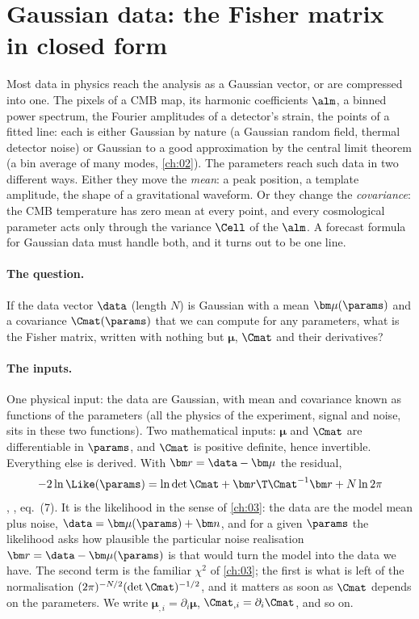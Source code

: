 \section{Gaussian data: the Fisher matrix in closed form}
\label{10a:sec:gauss}

Most data in physics reach the analysis as a Gaussian vector, or are compressed into one. The pixels of a CMB
map, its harmonic coefficients $\alm$, a binned power spectrum, the Fourier amplitudes of a detector's
strain, the points of a fitted line: each is either Gaussian by nature (a Gaussian random field, thermal
detector noise) or Gaussian to a good approximation by the central limit theorem (a bin average of many
modes, \cref{ch:02}). The parameters reach such data in two different ways. Either they move the
\emph{mean}: a peak position, a template amplitude, the shape of a gravitational waveform. Or they change the
\emph{covariance}: the CMB temperature has zero mean at every point, and every cosmological parameter acts
only through the variance $\Cell$ of the $\alm$. A forecast formula for Gaussian data must handle both, and
it turns out to be one line.

\paragraph{The question.} If the data vector $\data$ (length $N$) is Gaussian with a mean $\bm\mu(\params)$ and a
covariance $\Cmat(\params)$ that we can compute for any parameters, what is the Fisher matrix, written with
nothing but $\bm\mu$, $\Cmat$ and their derivatives?

\paragraph{The inputs.} One physical input: the data are Gaussian, with mean and covariance known as functions of
the parameters (all the physics of the experiment, signal and noise, sits in these two functions). Two
mathematical inputs: $\bm\mu$ and $\Cmat$ are differentiable in $\params$, and $\Cmat$ is positive definite,
hence invertible. Everything else is derived. With $\bm r=\data-\bm\mu$ the residual,
\begin{equation}
  -2\ln\Like(\params)=\ln\det\Cmat+\bm r\T\Cmat^{-1}\bm r+N\ln2\pi
  \label{10a:eq:gauss-like}
\end{equation}
, \cite{TTH1997}, eq.~(7). It is the likelihood in the sense of \cref{ch:03}: the data are the model mean plus noise, $\data=\bm\mu(\params)+\bm n$, and for a given $\params$ the likelihood asks how plausible the particular noise realisation $\bm r=\data-\bm\mu(\params)$ is that would turn the model into the data we have. The second term is the familiar $\chi^2$ of \cref{ch:03};
the first is what is left of the normalisation $(2\pi)^{-N/2}(\det\Cmat)^{-1/2}$, and it matters as soon as
$\Cmat$ depends on the parameters. We write $\bm\mu_{,i}=\partial_i\bm\mu$, $\Cmat_{,i}=\partial_i\Cmat$, and so on.

